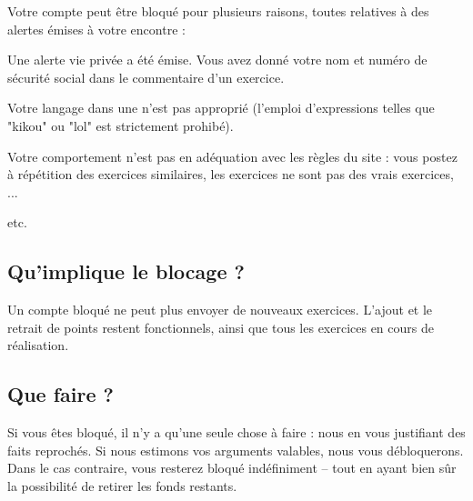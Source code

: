 ﻿Votre compte peut être bloqué pour plusieurs raisons, toutes relatives à des alertes émises à votre encontre :
\item Une alerte vie privée a été émise. Vous avez donné votre nom et numéro de sécurité social dans le commentaire d'un exercice.
\item Votre langage dans une  n'est pas approprié (l'emploi d'expressions telles que "kikou" ou "lol" est strictement prohibé).
\item Votre comportement n'est pas en adéquation avec les règles du site : vous postez à répétition des exercices similaires, les exercices ne sont pas des vrais exercices, ...
\item etc.

\subsection{Qu'implique le blocage ?}
Un compte bloqué ne peut plus envoyer de nouveaux exercices.
L'ajout et le retrait de points restent fonctionnels, ainsi que tous les exercices en cours de réalisation.

\subsection{Que faire ?}
Si vous êtes bloqué, il n'y a qu'une seule chose à faire : nous  en vous justifiant des faits reprochés. Si nous estimons vos arguments valables, nous vous débloquerons. Dans le cas contraire, vous resterez bloqué indéfiniment -- tout en ayant bien sûr la possibilité de retirer les fonds restants.